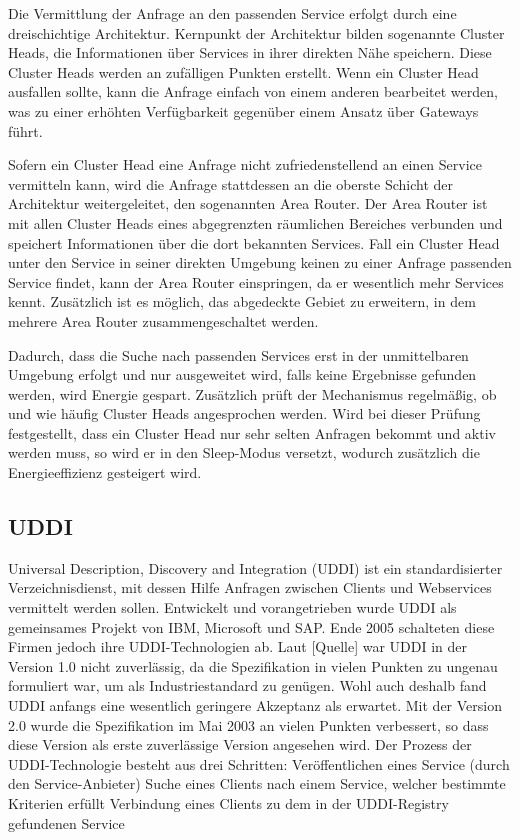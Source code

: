 \documentclass[conference,compsoc]{IEEEtran}
\begin{document}
Die Vermittlung der Anfrage an den passenden Service erfolgt durch eine dreischichtige Architektur. Kernpunkt der Architektur bilden sogenannte Cluster Heads, die Informationen über Services in ihrer direkten Nähe speichern. Diese Cluster Heads werden an zufälligen Punkten erstellt. Wenn ein Cluster Head ausfallen sollte, kann die Anfrage einfach von einem anderen bearbeitet werden, was zu einer erhöhten Verfügbarkeit gegenüber einem Ansatz über Gateways führt.

Sofern ein Cluster Head eine Anfrage nicht zufriedenstellend an einen Service vermitteln kann, wird die Anfrage stattdessen an die oberste Schicht der Architektur weitergeleitet, den sogenannten Area Router. Der Area Router ist mit allen Cluster Heads eines abgegrenzten räumlichen Bereiches verbunden und speichert Informationen über die dort bekannten Services. Fall ein Cluster Head unter den Service in seiner direkten Umgebung keinen zu einer Anfrage passenden Service findet, kann der Area Router einspringen, da er wesentlich mehr Services kennt. Zusätzlich ist es möglich, das abgedeckte Gebiet zu erweitern, in dem mehrere Area Router zusammengeschaltet werden.

Dadurch, dass die Suche nach passenden Services erst in der unmittelbaren Umgebung erfolgt und nur ausgeweitet wird, falls keine Ergebnisse gefunden werden, wird Energie gespart. Zusätzlich prüft der Mechanismus regelmäßig, ob und wie häufig Cluster Heads angesprochen werden. Wird bei dieser Prüfung festgestellt, dass ein Cluster Head nur sehr selten Anfragen bekommt und aktiv werden muss, so wird er in den Sleep-Modus versetzt, wodurch zusätzlich die Energieeffizienz gesteigert wird.

\subsection{UDDI}

Universal Description, Discovery and Integration (UDDI) ist ein standardisierter Verzeichnisdienst, mit dessen Hilfe Anfragen zwischen Clients und Webservices vermittelt werden sollen. Entwickelt und vorangetrieben wurde UDDI als gemeinsames Projekt von IBM, Microsoft und SAP. Ende 2005 schalteten diese Firmen jedoch ihre UDDI-Technologien ab.
Laut [Quelle] war UDDI in der Version 1.0 nicht zuverlässig, da die Spezifikation in vielen Punkten zu ungenau formuliert war, um als Industriestandard zu genügen. Wohl auch deshalb fand UDDI anfangs eine wesentlich geringere Akzeptanz als erwartet. Mit der Version 2.0 wurde die Spezifikation im Mai 2003 an vielen Punkten verbessert, so dass diese Version als erste zuverlässige Version angesehen wird.
Der Prozess der UDDI-Technologie besteht aus drei Schritten:
Veröffentlichen eines Service (durch den Service-Anbieter)
Suche eines Clients nach einem Service, welcher bestimmte Kriterien erfüllt
Verbindung eines Clients zu dem in der UDDI-Registry gefundenen Service
\end{document}
